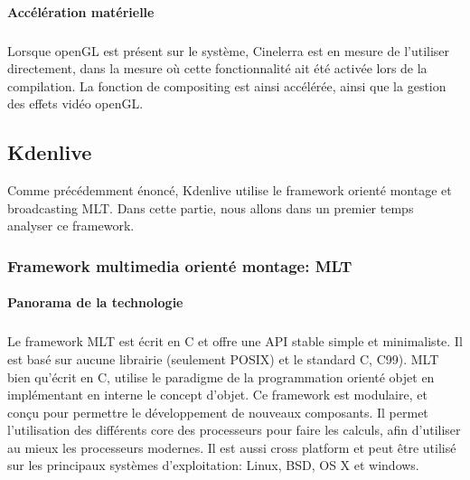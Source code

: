 \paragraph{Accélération matérielle}

\subparagraph{}

Lorsque openGL est présent sur le système, Cinelerra
est en mesure de l'utiliser directement, dans la mesure où cette
fonctionnalité ait été activée lors de la compilation. La fonction
de compositing est ainsi accélérée, ainsi que la gestion des effets
vidéo openGL.

\subsection {Kdenlive}

Comme précédemment énoncé, Kdenlive utilise le framework orienté
montage et broadcasting MLT. Dans cette partie, nous allons
dans un premier temps analyser ce framework.

\subsubsection {Framework multimedia orienté montage: MLT}

\paragraph {Panorama de la technologie} %

\subparagraph{}

Le framework MLT est écrit en C et offre une API
stable simple et minimaliste. Il est basé sur aucune librairie
(seulement POSIX)  et
le standard C, C99). MLT bien qu'écrit en C, utilise le
paradigme de la programmation orienté objet en implémentant en interne
le concept d'objet. Ce framework est modulaire, et conçu pour permettre
le développement de nouveaux composants. Il permet l'utilisation des
différents core des processeurs pour faire les calculs, afin d'utiliser
au mieux les processeurs modernes. Il est aussi cross platform et peut
être utilisé sur les principaux systèmes d'exploitation: Linux, BSD,
OS X et windows.

